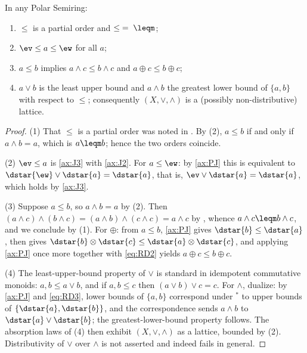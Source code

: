 \begin{proposition}\label{prop:order-structure}
In any Polar Semiring:
\begin{enumerate}
  \item $\leq$ is a partial order and $\leq \;=\; \leqm$;
  \item $\ev \leq a \leq \ew$ for all $a$;
  \item $a \leq b$ implies $a \wedge c \leq b \wedge c$ and
        $a \oplus c \leq b \oplus c$;
  \item $a \vee b$ is the least upper bound and $a \wedge b$ the greatest
        lower bound of $\{a,b\}$ with respect to $\leq$; consequently
        $(X,\vee,\wedge)$ is a (possibly non-distributive) lattice.
\end{enumerate}
\end{proposition}

\begin{proof}
(1) That $\leq$ is a partial order was noted in .
By (2), $a \leq b$ if and only if $a \wedge b = a$,
which is $a \leqm b$; hence the two orders coincide.

(2) $\ev \leq a$ is \eqref{ax:J3} with \eqref{ax:J2}. For $a \leq \ew$: by
\eqref{ax:PJ} this is equivalent to
$\dstar{\ew} \vee \dstar{a} = \dstar{a}$, that is,
$\ev \vee \dstar{a} = \dstar{a}$, which holds by \eqref{ax:J3}.

(3) Suppose $a \leq b$, so $a \wedge b = a$ by
(2). Then
$(a \wedge c) \wedge (b \wedge c) = (a \wedge b) \wedge (c \wedge c)
 = a \wedge c$
by , whence $a \wedge c \leqm b \wedge c$, and
we conclude by (1). For $\oplus$: from $a \leq b$,
\eqref{ax:PJ} gives $\dstar{b} \leq \dstar{a}$, then
 gives
$\dstar{b} \otimes \dstar{c} \leq \dstar{a} \otimes \dstar{c}$, and applying
\eqref{ax:PJ} once more together with \eqref{eq:RD2} yields
$a \oplus c \leq b \oplus c$.

(4) The least-upper-bound property of $\vee$ is standard in idempotent
commutative monoids: $a,b \leq a \vee b$, and if $a,b \leq c$ then
$(a \vee b) \vee c = c$. For $\wedge$, dualize: by \eqref{ax:PJ} and
\eqref{eq:RD3}, lower bounds of $\{a,b\}$ correspond under ${}^{*}$ to upper
bounds of $\{\dstar{a},\dstar{b}\}$, and the correspondence sends
$a \wedge b$ to $\dstar{a} \vee \dstar{b}$; the greatest-lower-bound
property follows. The absorption laws of (4) then
exhibit $(X,\vee,\wedge)$ as a lattice, bounded by (2). Distributivity of
$\vee$ over $\wedge$ is not asserted and indeed fails in general.
\end{proof}

